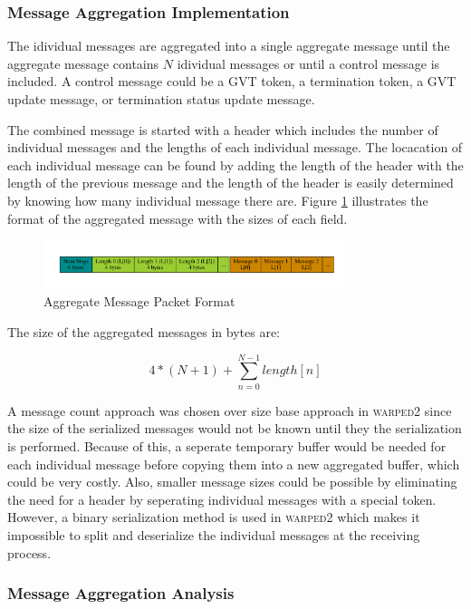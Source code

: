 \documentclass[11pt]{book}
\begin{document}
\subsubsection{Message Aggregation Implementation}

The idividual messages are aggregated into a single aggregate message until the aggregate message
contains $N$ idividual messages or until a control message is included.  A control message could be
a GVT token, a termination token, a GVT update message, or termination status update message.

The combined message is started with a header which includes the number of individual messages and
the lengths of each individual message.  The locacation of each individual message can be found by
adding the length of the header with the length of the previous message and the length of the header
is easily determined by knowing how many individual message there are.  Figure
\ref{aggregate_format} illustrates the format of the aggregated message with the sizes of each
field.

\begin{figure}
    \centering
    \includegraphics[width=0.8\textwidth,quiet]{figs/graphviz/aggregation_format.pdf}
    \caption{Aggregate Message Packet Format}\label{aggregate_format}
\end{figure}

\noindent
The size of the aggregated messages in bytes are:

$$ 4 * (N + 1) + \sum_{n=0}^{N-1} length[n] $$

\noindent
A message count approach was chosen over size base approach in \textsc{warped2} since the size of
the serialized messages would not be known until they the serialization is performed.  Because of
this, a seperate temporary buffer would be needed for each individual message before copying them
into a new aggregated buffer, which could be very costly.  Also, smaller message sizes could be
possible by eliminating the need for a header by seperating individual messages with a special
token.  However, a binary serialization method is used in \textsc{warped2} which makes it impossible
to split and deserialize the individual messages at the receiving process.

\subsubsection{Message Aggregation Analysis}
\end{document}
